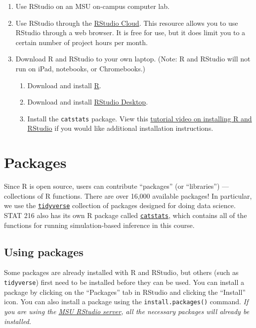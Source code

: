 \documentclass[
  10pt,
  openany]{book}
\providecommand{\tightlist}{%
  \setlength{\itemsep}{0pt}\setlength{\parskip}{0pt}}
\theoremstyle{definition}
\theoremstyle{definition}
\theoremstyle{definition}
\theoremstyle{definition}
\theoremstyle{remark}
\begin{document}
\begin{enumerate}
\def\labelenumi{\arabic{enumi}.}
\item
  Use RStudio on an MSU on-campus computer lab.
\item
  Use RStudio through the \href{https://rstudio.cloud/}{RStudio Cloud}. This resource allows you to use RStudio through a web browser. It is free for use, but it does limit you to a certain number of project hours per month.
\item
  Download R and RStudio to your own laptop. (Note: R and RStudio will not run on iPad, notebooks, or Chromebooks.)

  \begin{enumerate}
  \def\labelenumii{\alph{enumii}.}
  \tightlist
  \item
    Download and install \href{https://cloud.r-project.org/}{R}.
  \item
    Download and install \href{https://rstudio.com/products/rstudio/}{RStudio Desktop}.
  \item
    Install the \texttt{catstats} package.
    View this \href{https://rconnect.math.montana.edu/InstallDemo/}{tutorial video on installing R and RStudio} if you would
    like additional installation instructions.
  \end{enumerate}
\end{enumerate}

\section*{Packages}\label{packages}

Since R is open source, users can contribute ``packages'' (or ``libraries'') --- collections of R functions. There are over 16,000 available packages! In particular, we use
the \href{https://www.tidyverse.org/}{\texttt{tidyverse}} collection of packages designed for doing data science.
STAT 216 also has its own R package called \href{https://github.com/greenwood-stat/catstats}{\texttt{catstats}}, which contains all of the functions
for running simulation-based inference in this course.

\subsection*{Using packages}\label{using-packages}

Some packages are already installed with R and RStudio, but others (such as \texttt{tidyverse})
first need to be installed before they can be used. You can install a package
by clicking on the ``Packages'' tab in RStudio and clicking the ``Install'' icon.
You can also install a package using the \texttt{install.packages()} command.
\emph{If you are using the \href{https://rstudio.math.montana.edu/}{MSU RStudio server},
all the necessary packages will already be installed.}
\end{document}
